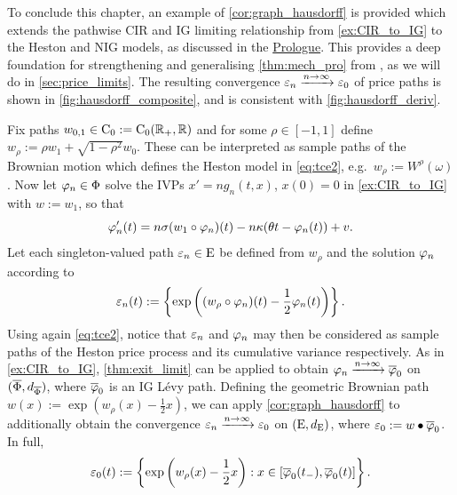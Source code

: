 To conclude this chapter, an example of \autoref{cor:graph_hausdorff} is provided which extends the pathwise CIR and IG limiting relationship from \autoref{ex:CIR_to_IG} to the Heston and NIG models, as discussed in the \hyperlink{prologue}{Prologue}. This provides a deep foundation for strengthening and generalising \autoref{thm:mech_pro} from \cite{mechkov_2015}, as we will do in \autoref{sec:price_limits}. The resulting convergence $\varepsilon_n\xrightarrow{n\to\infty}\varepsilon_0$ of price paths is shown in \autoref{fig:hausdorff_composite}, and is consistent with \autoref{fig:hausdorff_deriv}.

\begin{example}\label{ex:heston_to_NIG}
    Fix paths $w_{0,1}\in\mathrm{C}_0:=\mathrm{C}_0(\mathbb{R}_+,\mathbb{R})$ and for some $\rho\in[-1,1]$ define $w_\rho:=\rho w_1 + \sqrt{1-\rho^2}w_0$. These can be interpreted as sample paths of the Brownian motion which defines the Heston model in \autoref{eq:tce2}, e.g.~$w_{\rho}:=W^{\rho}(\omega)$. Now let $\varphi_n\in\Phi$ solve the IVPs $x'=ng_n(t,x)$, $x(0)=0$ in \autoref{ex:CIR_to_IG} with $w:=w_1$, so that
    \begin{equation}
        \varphi'_n(t) = n\sigma (w_1\circ\varphi_n)(t) - n\kappa(\theta t - \varphi_n(t)) + v.
    \end{equation}
    Let each singleton-valued path $\varepsilon_n\in\mathrm{E}$ be defined from $w_\rho$ and the solution $\varphi_n$ according to
    \begin{equation}
        \varepsilon_n(t) := \left\{\exp\left((w_\rho\circ\varphi_n)(t) - \frac12\varphi_n(t)\right)\right\}.
    \end{equation}
    Using again \autoref{eq:tce2}, notice that $\varepsilon_n$ and $\varphi_n$ may then be considered as sample paths of the Heston price process and its cumulative variance respectively. As in \autoref{ex:CIR_to_IG}, \autoref{thm:exit_limit} can be applied to obtain $\varphi_n\xrightarrow{n\to\infty}\overline{\varphi}_0$ on $(\overline{\Phi},d_{\overline{\Phi}})$, where $\overline{\varphi}_0$ is an IG L\'evy path. Defining the geometric Brownian path $w(x):=\exp(w_\rho(x)-\frac12 x)$, we can apply \autoref{cor:graph_hausdorff} to additionally obtain the convergence $\varepsilon_n\xrightarrow{n\to\infty}\varepsilon_0$ on $(\mathrm{E},d_{\mathrm{E}})$, where $\varepsilon_0:=w\bullet\overline{\varphi}_0$. In full,
    \begin{equation}\label{eq:pricelimit_def}
        \varepsilon_0(t) := \left\{\exp\left(w_\rho(x)-\frac12 x\right): x\in[\overline{\varphi}_0(t_-),\overline{\varphi}_0(t)]\right\}.
    \end{equation}
\end{example}

